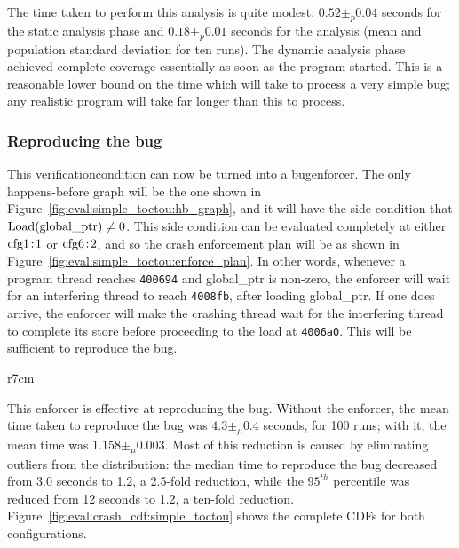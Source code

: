 The time taken to perform this analysis is quite modest: $0.52 \pm_p
0.04$ seconds for the static analysis phase and $0.18 \pm_p 0.01$
seconds for the {\StateMachine} analysis (mean and population standard
deviation for ten runs).  The dynamic analysis phase achieved complete
coverage essentially as soon as the program started.  This is a
reasonable lower bound on the time which {\technique} will take to
process a very simple bug; any realistic program will take far longer
than this to process.

\subsubsection{Reproducing the bug}
This \gls{verificationcondition} can now be turned into a
\gls{bugenforcer}.  The only happens-before graph will be the one
shown in Figure~\ref{fig:eval:simple_toctou:hb_graph}, and it will
have the side condition that $\mathrm{Load}(\mathrm{global\_ptr}) \not= 0$.
This side condition can be evaluated completely at either
$\mathrm{cfg1}\!:\!\mathrm{1}$ or $\mathrm{cfg6}\!:\!\mathrm{2}$, and so the crash enforcement plan
will be as shown in Figure~\ref{fig:eval:simple_toctou:enforce_plan}.
In other words, whenever a program thread reaches \texttt{400694} and
global\_ptr is non-zero, the enforcer will wait for an interfering
thread to reach \texttt{4008fb}, after loading global\_ptr.  If one
does arrive, the enforcer will make the crashing thread wait for the
interfering thread to complete its store before proceeding to the load
at \texttt{4006a0}.  This will be sufficient to reproduce the bug.

\begin{wrapfigure}{r}{7cm}
  \caption{Happens-before graph to be enforced for simple\_toctou}
  \label{fig:eval:simple_toctou:hb_graph}
\end{wrapfigure}
This enforcer is effective at reproducing the bug.  Without the
enforcer, the mean time taken to reproduce the bug was $4.3 \pm_\mu
0.4$ seconds, for 100 runs; with it, the mean time was $1.158 \pm_\mu
0.003$.  Most of this reduction is caused by eliminating outliers from
the distribution: the median time to reproduce the bug decreased from
3.0 seconds to 1.2, a 2.5-fold reduction, while the $95^{th}$
percentile was reduced from 12 seconds to 1.2, a ten-fold reduction.
Figure~\ref{fig:eval:crash_cdf:simple_toctou} shows the complete CDFs
for both configurations.

